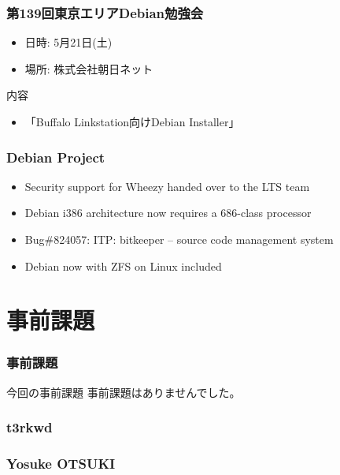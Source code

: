 \documentclass[cjk,dvipdfmx,10pt,compress,%
hyperref={bookmarks=true,bookmarksnumbered=true,bookmarksopen=false,%
colorlinks=false,%
pdftitle={第 109 回 関西 Debian 勉強会},%
pdfauthor={倉敷・のがた・佐々木・かわだ},%
pdfsubject={資料},%
}]{beamer}
\begin{document}
\begin{frame}[fragile]
  \frametitle{第139回東京エリアDebian勉強会}
  \begin{itemize}
  \item 日時: 5月21日(土)
  \item 場所: 株式会社朝日ネット
  \end{itemize}
  \begin{block}{内容}
    \begin{itemize}
    \item 「Buffalo Linkstation向けDebian Installer」
    \end{itemize}
  \end{block}
\end{frame}

\begin{frame}[fragile]
  \frametitle{Debian Project}
  \begin{itemize}
  \item Security support for Wheezy handed over to the LTS team
  \item Debian i386 architecture now requires a 686-class processor
  \item Bug\#824057: ITP: bitkeeper -- source code management system
  \item Debian now with ZFS on Linux included
  \end{itemize}
\end{frame}


\section{事前課題}

\begin{frame}[fragile]
  \frametitle{事前課題}
  \begin{block}{今回の事前課題}
    事前課題はありませんでした。
  \end{block}
\end{frame}


\begin{frame}
  \frametitle{ t3rkwd }
\end{frame}

\begin{frame}
  \frametitle{ Yosuke OTSUKI }
\end{frame}
\end{document}
